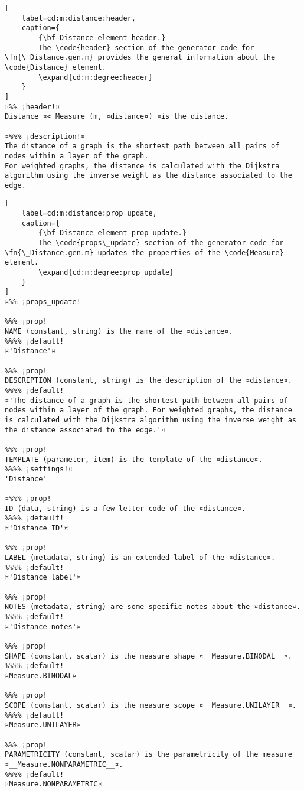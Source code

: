 \documentclass{tufte-handout}
\begin{document}
\begin{lstlisting}[
	label=cd:m:distance:header,
	caption={
		{\bf Distance element header.}
		The \code{header} section of the generator code for \fn{\_Distance.gen.m} provides the general information about the \code{Distance} element.
		\expand{cd:m:degree:header}
	}
]
¤%% ¡header!¤
Distance ¤< Measure (m, ¤distance¤) ¤is the distance.

¤%%% ¡description!¤
The distance of a graph is the shortest path between all pairs of nodes within a layer of the graph.
For weighted graphs, the distance is calculated with the Dijkstra algorithm using the inverse weight as the distance associated to the edge.
\end{lstlisting}

\begin{lstlisting}[
	label=cd:m:distance:prop_update,
	caption={
		{\bf Distance element prop update.}
		The \code{props\_update} section of the generator code for \fn{\_Distance.gen.m} updates the properties of the \code{Measure} element.
		\expand{cd:m:degree:prop_update}
	}
]
¤%% ¡props_update!

%%% ¡prop!
NAME (constant, string) is the name of the ¤distance¤.
%%%% ¡default!
¤'Distance'¤

%%% ¡prop!
DESCRIPTION (constant, string) is the description of the ¤distance¤.
%%%% ¡default!
¤'The distance of a graph is the shortest path between all pairs of nodes within a layer of the graph. For weighted graphs, the distance is calculated with the Dijkstra algorithm using the inverse weight as the distance associated to the edge.'¤

%%% ¡prop!
TEMPLATE (parameter, item) is the template of the ¤distance¤.
%%%% ¡settings!¤
'Distance'

¤%%% ¡prop!
ID (data, string) is a few-letter code of the ¤distance¤.
%%%% ¡default!
¤'Distance ID'¤

%%% ¡prop!
LABEL (metadata, string) is an extended label of the ¤distance¤.
%%%% ¡default!
¤'Distance label'¤

%%% ¡prop!
NOTES (metadata, string) are some specific notes about the ¤distance¤.
%%%% ¡default!
¤'Distance notes'¤

%%% ¡prop!
SHAPE (constant, scalar) is the measure shape ¤__Measure.BINODAL__¤.
%%%% ¡default!
¤Measure.BINODAL¤

%%% ¡prop!
SCOPE (constant, scalar) is the measure scope ¤__Measure.UNILAYER__¤.
%%%% ¡default!
¤Measure.UNILAYER¤

%%% ¡prop!
PARAMETRICITY (constant, scalar) is the parametricity of the measure ¤__Measure.NONPARAMETRIC__¤.
%%%% ¡default!
¤Measure.NONPARAMETRIC¤


\end{lstlisting}
\end{document}
